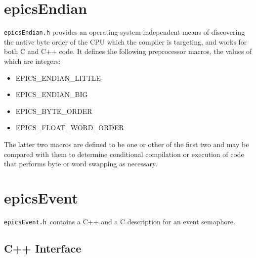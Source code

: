 \section{epicsEndian}

\verb|epicsEndian.h| provides an operating-system independent means of discovering the native byte order of the CPU 
which the compiler is targeting, and works for both C and C++ code. It defines the following preprocessor macros, the 
values of which are integers:

\begin{itemize}\item EPICS\_ENDIAN\_LITTLE

\item EPICS\_ENDIAN\_BIG

\item EPICS\_BYTE\_ORDER

\item EPICS\_FLOAT\_WORD\_ORDER

\end{itemize}The latter two macros are defined to be one or other of the first two and may be compared with them to determine 
conditional compilation or execution of code that performs byte or word swapping as necessary.

\section{epicsEvent}

\verb|epicsEvent.h |contains a C++ and a C description for an event semaphore.

\subsection{C++ Interface}

